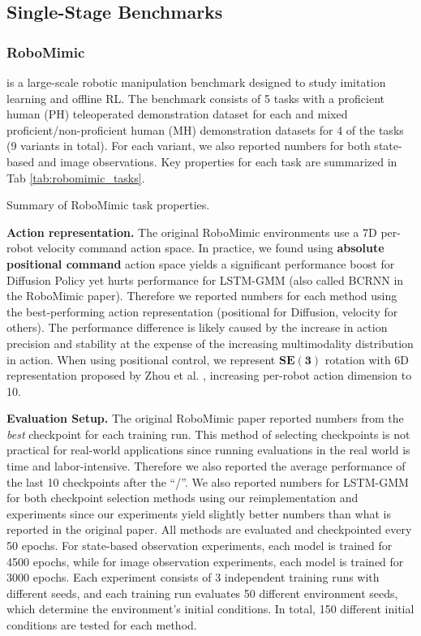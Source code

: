 \subsection{Single-Stage Benchmarks}
\subsubsection{\textbf{RoboMimic}} \cite{robomimic} is a large-scale robotic manipulation benchmark designed to study imitation learning and offline RL. The benchmark consists of 5 tasks with a proficient human (PH) teleoperated demonstration dataset for each and mixed proficient/non-proficient human (MH) demonstration datasets for 4 of the tasks (9 variants in total). For each variant, we also reported numbers for both state-based and image observations. Key properties for each task are summarized in Tab \ref{tab:robomimic_tasks}. 

\begin{table}
\centering

\caption{Summary of RoboMimic \cite{robomimic} task properties. }
\label{tab:robomimic_tasks}
\end{table}

\textbf{Action representation.} The original RoboMimic environments \cite{robomimic} use a 7D per-robot velocity command action space. In practice, we found using \textbf{absolute positional command} action space yields a significant performance boost for Diffusion Policy yet hurts performance for LSTM-GMM (also called BCRNN in the RoboMimic paper). Therefore we reported numbers for each method using the best-performing action representation (positional for Diffusion, velocity for others). The performance difference is likely caused by the increase in action precision and stability at the expense of the increasing multimodality distribution in action. When using positional control, we represent $\mathbf{SE(3)}$ rotation with 6D representation proposed by Zhou et al. \cite{zhou2019continuity}, increasing per-robot action dimension to 10.

 \textbf{Evaluation Setup.} The original RoboMimic paper reported numbers from the \textit{best} checkpoint for each training run. This method of selecting checkpoints is not practical for real-world applications since running evaluations in the real world is time and labor-intensive. Therefore we also reported the average performance of the last 10 checkpoints after the ``/''. We also reported numbers for LSTM-GMM for both checkpoint selection methods using our reimplementation and experiments since our experiments yield slightly better numbers than what is reported in the original paper. All methods are evaluated and checkpointed every 50 epochs. For state-based observation experiments, each model is trained for 4500 epochs, while for image observation experiments, each model is trained for 3000 epochs. Each experiment consists of 3 independent training runs with different seeds, and each training run evaluates 50 different environment seeds, which determine the environment's initial conditions. In total, 150 different initial conditions are tested for each method. 


